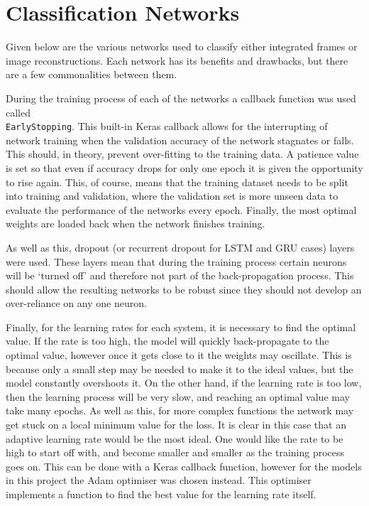 \section{Classification Networks}

Given below are the various networks used to classify either integrated frames or image reconstructions. Each network has its benefits and drawbacks, but there are a few commonalities between them. 

During the training process of each of the networks a callback function was used called\\ \lstinline{EarlyStopping}. This built-in Keras callback allows for the interrupting of network training when the validation accuracy of the network stagnates or falls. This should, in theory, prevent over-fitting to the training data. A patience value is set so that even if accuracy drops for only one epoch it is given the opportunity to rise again. This, of course, means that the training dataset needs to be split into training and validation, where the validation set is more unseen data to evaluate the performance of the networks every epoch. Finally, the most optimal weights are loaded back when the network finishes training. 

As well as this, dropout (or recurrent dropout for LSTM and GRU cases) layers were used. These layers mean that during the training process certain neurons will be `turned off' and therefore not part of the back-propagation process. This should allow the resulting networks to be robust since they should not develop an over-reliance on any one neuron.

Finally, for the learning rates for each system, it is necessary to find the optimal value. If the rate is too high, the model will quickly back-propagate to the optimal value, however once it gets close to it the weights may oscillate. This is because only a small step may be needed to make it to the ideal values, but the model constantly overshoots it. On the other hand, if the learning rate is too low, then the learning process will be very slow, and reaching an optimal value may take many epochs. As well as this, for more complex functions the network may get stuck on a local minimum value for the loss. It is clear in this case that an adaptive learning rate would be the most ideal. One would like the rate to be high to start off with, and become smaller and smaller as the training process goes on. This can be done with a Keras callback function, however for the models in this project the Adam optimiser\cite{Adam} was chosen instead. This optimiser implements a function to find the best value for the learning rate itself.


